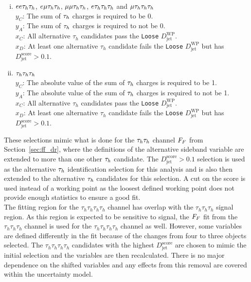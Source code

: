 \begin{enumerate}[i)]
   \item $ee\tau_{h}\tau_{h}$, $e\mu\tau_{h}\tau_{h}$, $\mu\mu\tau_{h}\tau_{h}$, $e\tau_{h}\tau_{h}\tau_{h}$ and $\mu\tau_{h}\tau_{h}\tau_{h}$  \\
     \indent $y_C$: The sum of $\tau_{h}$ charges is required to be 0. \\
     \indent $y_A$: The sum of $\tau_{h}$ charges is required to not be 0. \\
     \indent $x_C$: All alternative $\tau_h$ candidates pass the \texttt{Loose} $D_{\text{jet}}^{\text{WP}}$. \\
     \indent $x_D$: At least one alternative $\tau_h$ candidate fails the \texttt{Loose} $D_{\text{jet}}^{\text{WP}}$ but has $D_{\text{jet}}^{\text{score}} > 0.1$.
  \item $\tau_{h}\tau_{h}\tau_{h}$ \\
     \indent $y_C$: The absolute value of the sum of $\tau_{h}$ charges is required to be 1. \\
     \indent $y_A$: The absolute value of the sum of $\tau_{h}$ charges is required to not be 1. \\
     \indent $x_C$: All alternative $\tau_h$ candidates pass the \texttt{Loose} $D_{\text{jet}}^{\text{WP}}$. \\
     \indent $x_D$: At least one alternative $\tau_h$ candidate fails the \texttt{Loose} $D_{\text{jet}}^{\text{WP}}$ but has $D_{\text{jet}}^{\text{score}} > 0.1$.
\end{enumerate}

These selections mimic what is done for the $\tau_{h}\tau_{h}$ channel $F_{F}$ from Section~\ref{sec:ff_dr}, where the definitions of the alternative sideband variable are extended to more than one other $\tau_{h}$ candidate.
The $D_{\text{jet}}^{\text{score}} > 0.1$ selection is used as the alternative $\tau_{h}$ identification selection for this analysis and is also then extended to the alternative $\tau_{h}$ candidates for this selection.
A cut on the score is used instead of a working point as the loosest defined working point does not provide enough statistics to ensure a good fit. \\

The fitting region for the $\tau_h \tau_h \tau_h \tau_h$ channel has overlap with the $\tau_h \tau_h \tau_h$ signal region.
As this region is expected to be sensitive to signal, the $F_{F}$ fit from the $\tau_h \tau_h \tau_h$ channel is used for the $\tau_h \tau_h \tau_h \tau_h$ channel as well. 
However, some variables are defined differently in the fit because of the changes from four to three objects selected. 
The $\tau_h \tau_h \tau_h \tau_h$ candidates with the highest $D_{\text{jet}}^{\text{score}}$ are chosen to mimic the initial selection and the variables are then recalculated.
There is no major dependence on the shifted variables and any effects from this removal are covered within the uncertainty model. \\

